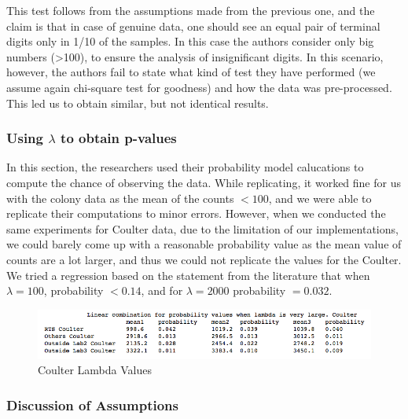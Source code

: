 \documentclass{article}
\begin{document}
This test follows from the assumptions made from the previous one, and the claim is that in case of genuine data, one should see an equal
pair of terminal digits only in 1/10 of the samples. In this case the
authors consider only big numbers (\textgreater{}100), to ensure the
analysis of insignificant digits. In this scenario, however,
the authors fail to state what kind of test they have performed (we
assume again chi-square test for goodness) and how the data was
pre-processed. This led us to obtain similar, but not identical results.

    \subsubsection{Using $\lambda$ to obtain
p-values}\label{using-lambda-to-obtain-p-values}

In this section, the researchers used their probability model calucations to compute the chance of observing the data. While replicating,
it worked fine for us with the colony data as the mean of the counts $<100$, and we were able to replicate their computations to minor errors. However, when we conducted the same experiments for Coulter data, due to the limitation of our implementations, we could barely come up with a reasonable probability value as the mean value of counts are a lot larger, and thus we could not replicate the values for the Coulter. We tried a regression based on the statement from the
literature that when $\lambda = 100$, probability $<0.14$, and for $\lambda = 2000$ probability $= 0.032$. 

\begin{figure}[htbp]
\centering
\includegraphics[width=0.9\linewidth]{images/Lambda_Coulter.png}
\caption{Coulter Lambda Values}
\end{figure}

\subsubsection{Discussion of
Assumptions}\label{discussion-of-assumptions}
\end{document}
